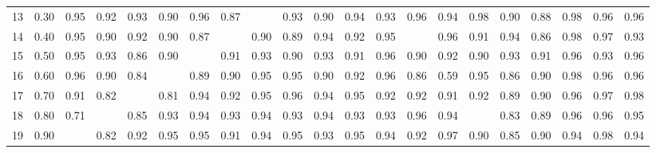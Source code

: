 \begin{table}[ht]
\begin{tabular}{rrrrrrrrrrrrrrrrrrrrr}
  13 & 0.30 & 0.95 & 0.92 & 0.93 & 0.90 & 0.96 & 0.87 &  & 0.93 & 0.90 & 0.94 & 0.93 & 0.96 & 0.94 & 0.98 & 0.90 & 0.88 & 0.98 & 0.96 & 0.96 \\ 
  14 & 0.40 & 0.95 & 0.90 & 0.92 & 0.90 & 0.87 &  & 0.90 & 0.89 & 0.94 & 0.92 & 0.95 &  & 0.96 & 0.91 & 0.94 & 0.86 & 0.98 & 0.97 & 0.93 \\ 
  15 & 0.50 & 0.95 & 0.93 & 0.86 & 0.90 &  & 0.91 & 0.93 & 0.90 & 0.93 & 0.91 & 0.96 & 0.90 & 0.92 & 0.90 & 0.93 & 0.91 & 0.96 & 0.93 & 0.96 \\ 
  16 & 0.60 & 0.96 & 0.90 & 0.84 &  & 0.89 & 0.90 & 0.95 & 0.95 & 0.90 & 0.92 & 0.96 & 0.86 & 0.59 & 0.95 & 0.86 & 0.90 & 0.98 & 0.96 & 0.96 \\ 
  17 & 0.70 & 0.91 & 0.82 &  & 0.81 & 0.94 & 0.92 & 0.95 & 0.96 & 0.94 & 0.95 & 0.92 & 0.92 & 0.91 & 0.92 & 0.89 & 0.90 & 0.96 & 0.97 & 0.98 \\ 
  18 & 0.80 & 0.71 &  & 0.85 & 0.93 & 0.94 & 0.93 & 0.94 & 0.93 & 0.94 & 0.93 & 0.93 & 0.96 & 0.94 &  & 0.83 & 0.89 & 0.96 & 0.96 & 0.95 \\ 
  19 & 0.90 &  & 0.82 & 0.92 & 0.95 & 0.95 & 0.91 & 0.94 & 0.95 & 0.93 & 0.95 & 0.94 & 0.92 & 0.97 & 0.90 & 0.85 & 0.90 & 0.94 & 0.98 & 0.94 \\ 
   \hline
\end{tabular}
\end{table}
